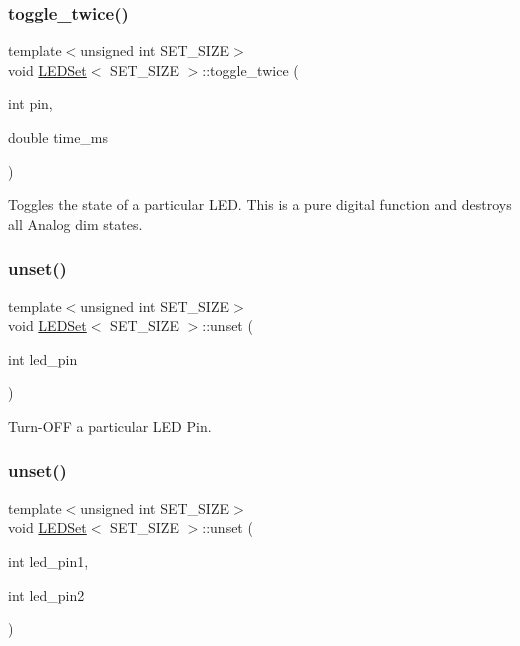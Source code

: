 \subsubsection{\texorpdfstring{toggle\+\_\+twice()}{toggle\_twice()}}
{\footnotesize\ttfamily template$<$unsigned int S\+E\+T\+\_\+\+S\+I\+ZE$>$ \\
void \hyperlink{classLEDSet}{L\+E\+D\+Set}$<$ S\+E\+T\+\_\+\+S\+I\+ZE $>$\+::toggle\+\_\+twice (\begin{DoxyParamCaption}\item[{int}]{pin,  }\item[{double}]{time\+\_\+ms }\end{DoxyParamCaption})\hspace{0.3cm}{\ttfamily [inline]}}



Toggles the state of a particular L\+ED. This is a pure digital function and destroys all Analog dim states. 

\mbox{\label{classLEDSet_aacc3566d74c4051350977b578ada3a4d}} 
\subsubsection{\texorpdfstring{unset()}{unset()}\hspace{0.1cm}{\footnotesize\ttfamily [1/3]}}
{\footnotesize\ttfamily template$<$unsigned int S\+E\+T\+\_\+\+S\+I\+ZE$>$ \\
void \hyperlink{classLEDSet}{L\+E\+D\+Set}$<$ S\+E\+T\+\_\+\+S\+I\+ZE $>$\+::unset (\begin{DoxyParamCaption}\item[{int}]{led\+\_\+pin }\end{DoxyParamCaption})\hspace{0.3cm}{\ttfamily [inline]}}



Turn-\/\+O\+FF a particular L\+ED Pin. 

\mbox{\label{classLEDSet_ac84aa5b9e72689bbfd71f556995dfe03}} 
\subsubsection{\texorpdfstring{unset()}{unset()}\hspace{0.1cm}{\footnotesize\ttfamily [2/3]}}
{\footnotesize\ttfamily template$<$unsigned int S\+E\+T\+\_\+\+S\+I\+ZE$>$ \\
void \hyperlink{classLEDSet}{L\+E\+D\+Set}$<$ S\+E\+T\+\_\+\+S\+I\+ZE $>$\+::unset (\begin{DoxyParamCaption}\item[{int}]{led\+\_\+pin1,  }\item[{int}]{led\+\_\+pin2 }\end{DoxyParamCaption})\hspace{0.3cm}{\ttfamily [inline]}}



